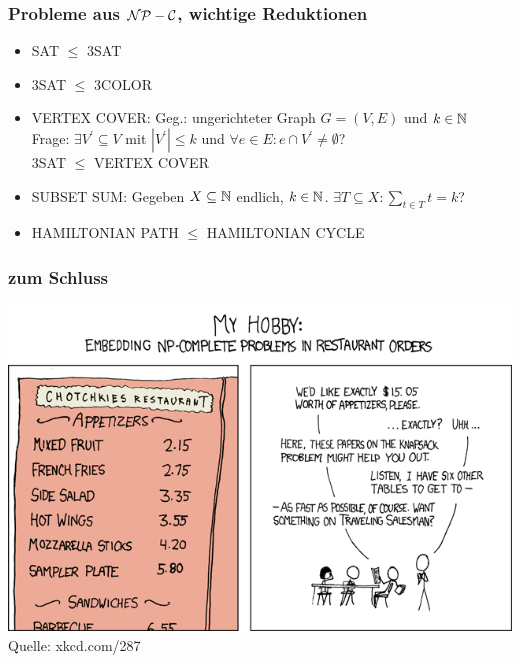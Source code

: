 \documentclass{beamer}
\newcommand{\N}{\ensuremath \mathbb{N}}
\newcommand{\NPC}{\ensuremath \mathcal{NP-C}}
\begin{document}
\begin{frame}
\frametitle{Probleme aus $\NPC$, wichtige Reduktionen}
\begin{itemize}
\item SAT $\leq$ 3SAT\pause
\item 3SAT $\leq$ 3COLOR\pause
\item VERTEX COVER: Geg.: ungerichteter Graph $G=(V,E)$ und $k\in\N$\\
Frage: $\exists V^\prime\subseteq V$ mit $|V^\prime|\leq k$ und $\forall e\in E:e\cap V^\prime\neq\emptyset$?\\ 3SAT $\leq$ VERTEX COVER\pause
\item SUBSET SUM: Gegeben $X\subseteq\N$ endlich, $k\in\N$. $\exists T\subseteq X:\sum\limits_{t\in T}t=k$?\pause
\item HAMILTONIAN PATH $\leq$ HAMILTONIAN CYCLE
\end{itemize}
\end{frame}

\begin{frame}
\frametitle{zum Schluss}
\includegraphics[scale=4]{np_complete.png}\\
{\tiny Quelle: xkcd.com/287}
\end{frame}
\end{document}
